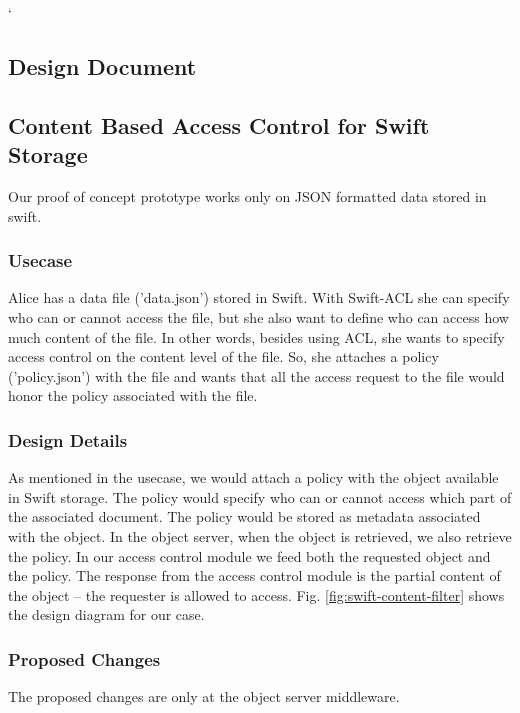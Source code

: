\newpage
`
\newpage
\begin{appendices}
\section{Design Document} \label{App:design-document}

\subsection{  Content Based Access Control for Swift Storage }
Our proof of concept prototype works only on JSON formatted data stored in swift.

\subsubsection{ Usecase}
Alice has a  data file ('data.json') stored in Swift. With  Swift-ACL she can specify who can or cannot access the file, but she also want to define who can access how much content of the file. In other words,  besides using ACL, she wants to specify access control on the content level of the file.  So, she  attaches a  policy ('policy.json')  with the file and wants that all the access request to the file would honor the policy associated with the file.

\subsubsection{Design Details}
As mentioned in the usecase, we would attach a policy with the object available in  Swift storage. The policy  would specify who can or cannot access which part of the associated document. The policy would be stored as metadata associated with the object. In the object server, when the object is  retrieved, we also retrieve the policy. In our access control module we feed both the requested object and the policy. The response from the access control module is the partial content of the object – the requester is allowed to access. Fig. \ref{fig:swift-content-filter} shows the design diagram for our case.

\subsubsection{Proposed Changes}
The proposed changes are only at the object server middleware.

\begin{itemize}


\end{itemize}
\end{appendices}

